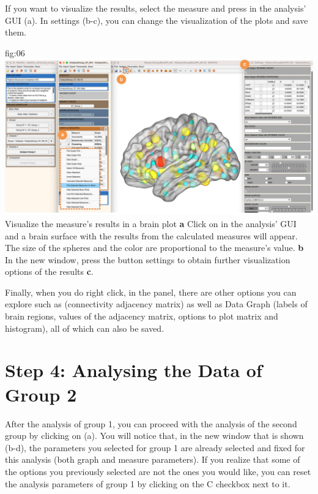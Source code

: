 \documentclass[justified]{tufte-handout}
\begin{document}
 If you want to visualize the results, select the measure and press  in the analysis' GUI (a). In settings (b-c), you can change the visualization of the plots and save them. 
 
	{fig:06}
	{
	\includegraphics{fig06.jpg}
	}
	{Visualize the measure's results in a brain plot}
	{
	{\bf a} Click on  in the analysis' GUI and a brain surface with the results from the calculated measures will appear. The size of the spheres and the color are proportional to the measure's value.   
        {\bf b} In the new window, press the button settings to obtain further visualization options of the results {\bf c}. 
	}
 
 Finally, when you do right click, in the  panel, there are other options you can explore such as  (connectivity adjacency matrix) as well as Data Graph (labels of brain regions, values of the adjacency matrix, options to plot matrix and histogram), all of which can also be saved.
  
\section{Step 4: Analysing the Data of Group 2}

After the analysis of group 1, you can proceed with the analysis of the second group by clicking on  (a). You will notice that, in the new window that is shown (b-d), the parameters you selected for group 1 are already selected and fixed for this analysis (both graph and measure parameters). If you realize that some of the options you previously selected are not the ones you would like, you can reset the analysis parameters of group 1 by clicking on the C checkbox next to it.
\end{document}
